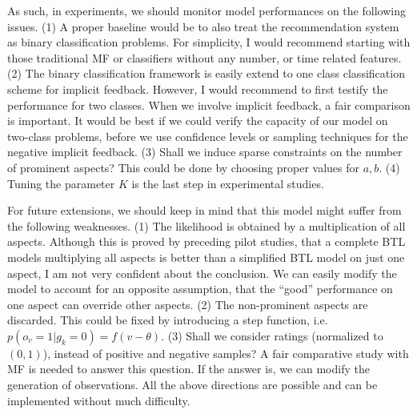 \documentclass[11pt]{report}
\begin{document}
As such, in experiments, we should monitor model performances on the following issues. (1) A proper baseline would be to also treat the recommendation system as binary classification problems. For simplicity, I would recommend starting with those traditional MF or classifiers without any number, or time related features. (2) The binary classification framework is easily extend to one class classification scheme for implicit feedback. However, I would recommend to first testify the performance for two classes. When we involve implicit feedback, a fair comparison is important. It would be best if we could verify the capacity of our model on two-class problems, before we use confidence levels or sampling techniques for the negative implicit feedback. (3) Shall we induce sparse constraints on the number of prominent aspects? This could be done by choosing proper values for $a,b$.  (4) Tuning the parameter $K$ is the last step in experimental studies.
 
For future extensions, we should keep in mind that this model might suffer from the following weaknesses. (1) The likelihood is obtained by a multiplication of all aspects. Although this is proved by preceding pilot studies, that a complete BTL models multiplying all aspects is better than a simplified BTL model on just one aspect, I am not very confident about the conclusion. We can easily modify the model to account for an opposite assumption, that the ``good'' performance on one aspect can override other aspects.  (2) The non-prominent aspects are discarded. This could be fixed by introducing a step function, i.e. $p(o_v=1|g_k=0)=f(v-\theta)$.  (3)  Shall we consider ratings (normalized to $(0,1)$), instead of positive and negative samples? A fair comparative study with MF is needed to answer this question.  If the answer is, we can modify the generation of observations. All the above directions are possible and can be implemented without much difficulty.
 
\end{document}
